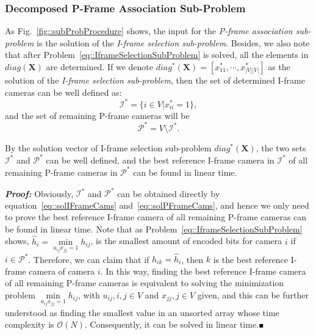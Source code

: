 \subsubsection{Decomposed P-Frame Association Sub-Problem}
\label{sec::PFrameScheduling}
As Fig.~\ref{fig::subProbProcedure} shows, the input for the \emph{P-frame association sub-problem} is the solution of the \emph{I-frame selection sub-problem}.
Besides, we also note that after Problem~\eqref{eq::IframeSelectionSubProblem} is solved, all the elements in $diag(\mathbf{X})$ are determined.
If we denote ${diag^*(\mathbf{X}) = \left[ x_{11}^*, \cdots, x_{|V||V|}^* \right]}$ as the solution of the \emph{I-frame selection sub-problem}, then the set of determined I-frame cameras can be well defined as:
\begin{equation}
\mathcal{I}^* = \{ i \in V | x_{ii}^* = 1\},
\label{eq::solIFrameCams}
\end{equation}
and the set of remaining P-frame cameras will be
\begin{equation}
\mathcal{P}^* = V \setminus \mathcal{I}^*.
\label{eq::solPFrameCams}
\end{equation} 
%
\begin{mylem}
By the solution vector of I-frame selection sub-problem $diag^*(\mathbf{X})$, the two sets $\mathcal{I}^*$ and $\mathcal{P}^*$ can be well defined, and the best reference I-frame camera in $\mathcal{I}^*$ of all remaining P-frame cameras in $\mathcal{P}^*$ can be found in linear time.
\label{lemma::findBestICamEasy}
\end{mylem}
\textbf{\emph{Proof:}}
Obviously, $\mathcal{I}^*$ and $\mathcal{P}^*$ can be obtained directly by equation~\eqref{eq::solIFrameCams} and~\eqref{eq::solPFrameCams}, and hence we only need to prove the best reference I-frame camera of all remaining P-frame cameras can be found in linear time.
Note that as Problem~\eqref{eq::IframeSelectionSubProblem} shows, ${\hat{h}_i = \underset{u_{ij}x_{jj} = 1}{\min} h_{ij}}$, is the smallest amount of encoded bits for camera $i$ if $i \in \mathcal{P}^*$.
Therefore, we can claim that if $h_{ik} = \hat{h}_i$, then $k$ is the best reference I-frame camera of camera $i$.
In this way, finding the best reference I-frame camera of all remaining P-frame cameras is equivalent to solving the minimization problem ${\underset{u_{ij}x_{jj} = 1}{\min} h_{ij}}$, with ${u_{ij}, i,j \in V}$ and ${x_{jj}, j \in V}$ given, and this can be further understood as finding the smallest value in an unsorted array whose time complexity is $\mathcal{O}(N)$.
Consequently, it can be solved in linear time.\hfill$\mathsmaller{\mathsmaller{\blacksquare}}$

